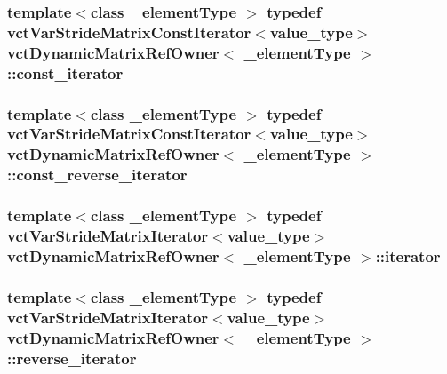 \subsubsection[{const\+\_\+iterator}]{\setlength{\rightskip}{0pt plus 5cm}template$<$class \+\_\+element\+Type $>$ typedef {\bf vct\+Var\+Stride\+Matrix\+Const\+Iterator}$<$value\+\_\+type$>$ {\bf vct\+Dynamic\+Matrix\+Ref\+Owner}$<$ \+\_\+element\+Type $>$\+::{\bf const\+\_\+iterator}}\label{classvct_dynamic_matrix_ref_owner_a7a8df19473cc2e95e25c4d1bf4bacbe4}
\hypertarget{classvct_dynamic_matrix_ref_owner_a50c3b985899b0d6cb2f9fab9f8305207}{}
\subsubsection[{const\+\_\+reverse\+\_\+iterator}]{\setlength{\rightskip}{0pt plus 5cm}template$<$class \+\_\+element\+Type $>$ typedef {\bf vct\+Var\+Stride\+Matrix\+Const\+Iterator}$<$value\+\_\+type$>$ {\bf vct\+Dynamic\+Matrix\+Ref\+Owner}$<$ \+\_\+element\+Type $>$\+::{\bf const\+\_\+reverse\+\_\+iterator}}\label{classvct_dynamic_matrix_ref_owner_a50c3b985899b0d6cb2f9fab9f8305207}
\hypertarget{classvct_dynamic_matrix_ref_owner_aaf9f6aaf86c05aec0bcd354d40c11863}{}
\subsubsection[{iterator}]{\setlength{\rightskip}{0pt plus 5cm}template$<$class \+\_\+element\+Type $>$ typedef {\bf vct\+Var\+Stride\+Matrix\+Iterator}$<$value\+\_\+type$>$ {\bf vct\+Dynamic\+Matrix\+Ref\+Owner}$<$ \+\_\+element\+Type $>$\+::{\bf iterator}}\label{classvct_dynamic_matrix_ref_owner_aaf9f6aaf86c05aec0bcd354d40c11863}
\hypertarget{classvct_dynamic_matrix_ref_owner_a133b22e9f6b4e7a20998ad3db72ed6c3}{}
\subsubsection[{reverse\+\_\+iterator}]{\setlength{\rightskip}{0pt plus 5cm}template$<$class \+\_\+element\+Type $>$ typedef {\bf vct\+Var\+Stride\+Matrix\+Iterator}$<$value\+\_\+type$>$ {\bf vct\+Dynamic\+Matrix\+Ref\+Owner}$<$ \+\_\+element\+Type $>$\+::{\bf reverse\+\_\+iterator}}\label{classvct_dynamic_matrix_ref_owner_a133b22e9f6b4e7a20998ad3db72ed6c3}
\hypertarget{classvct_dynamic_matrix_ref_owner_a004c89da7faff7d573988fc3b9ec43d9}{}
